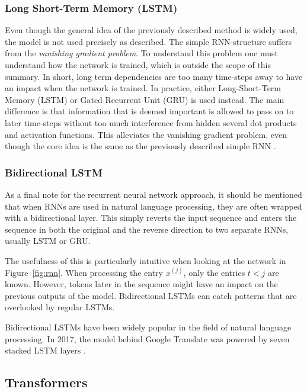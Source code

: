 \subsubsection{Long Short-Term Memory (LSTM)}

Even though the general idea of the previously described method is widely used, the model is not used precisely as described. The simple RNN-structure suffers from the \textit{vanishing gradient problem}. To understand this problem one must understand how the network is trained, which is outside the scope of this summary. In short, long term dependencies are too many time-steps away to have an impact when the network is trained. In practice, either Long-Short-Term Memory (LSTM) or Gated Recurrent Unit (GRU) is used instead. The main difference is that information that is deemed important is allowed to pass on to later time-steps without too much interference from hidden several dot products and activation functions. This alleviates the vanishing gradient problem, even though the core idea is the same as the previously described simple RNN \citep{chollet2017deep}.

\subsubsection*{Bidirectional LSTM}

As a final note for the recurrent neural network approach, it should be mentioned that when RNNs are used in natural language processing, they are often wrapped with a bidirectional layer. This simply reverts the input sequence and enters the sequence in both the original and the reverse direction to two separate RNNs, usually LSTM or GRU. 

The usefulness of this is particularly intuitive when looking at the network in Figure~\ref{fig:rnn}. When processing the entry $x^{(j)}$, only the entries $t < j$ are known. However, tokens later in the sequence might have an impact on the previous outputs of the model. Bidirectional LSTMs can catch patterns that are overlooked by regular LSTMs.

Bidirectional LSTMs have been widely popular in the field of natural language processing. In 2017, the model behind Google Translate was powered by seven stacked LSTM layers \citep{chollet2017deep}. 

\subsection{Transformers}

